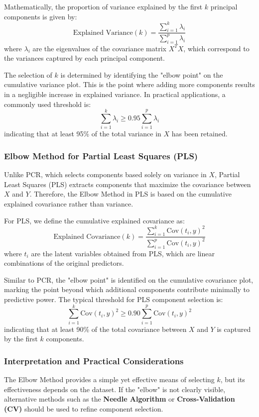 \documentclass[11pt,twoside,a4paper]{article}
\begin{document}
Mathematically, the proportion of variance explained by the first \( k \) principal components is given by:
\[
\text{Explained Variance}(k) = \frac{\sum_{i=1}^{k} \lambda_i}{\sum_{i=1}^{p} \lambda_i}
\]
where \( \lambda_i \) are the eigenvalues of the covariance matrix \( X^T X \), which correspond to the variances captured by each principal component.

The selection of \( k \) is determined by identifying the "elbow point" on the cumulative variance plot. This is the point where adding more components results in a negligible increase in explained variance. In practical applications, a commonly used threshold is:
\[
\sum_{i=1}^{k} \lambda_i \geq 0.95 \sum_{i=1}^{p} \lambda_i
\]
indicating that at least 95\% of the total variance in \( X \) has been retained.

\subsubsection{Elbow Method for Partial Least Squares (PLS)}
Unlike PCR, which selects components based solely on variance in \( X \), Partial Least Squares (PLS) extracts components that maximize the covariance between \( X \) and \( Y \). Therefore, the Elbow Method in PLS is based on the cumulative explained covariance rather than variance.

For PLS, we define the cumulative explained covariance as:
\[
\text{Explained Covariance}(k) = \frac{\sum_{i=1}^{k} \text{Cov}(t_i, y)^2}{\sum_{i=1}^{p} \text{Cov}(t_i, y)^2}
\]
where \( t_i \) are the latent variables obtained from PLS, which are linear combinations of the original predictors.

Similar to PCR, the "elbow point" is identified on the cumulative covariance plot, marking the point beyond which additional components contribute minimally to predictive power. The typical threshold for PLS component selection is:
\[
\sum_{i=1}^{k} \text{Cov}(t_i, y)^2 \geq 0.90 \sum_{i=1}^{p} \text{Cov}(t_i, y)^2
\]
indicating that at least 90\% of the total covariance between \( X \) and \( Y \) is captured by the first \( k \) components.

\subsubsection{Interpretation and Practical Considerations}
The Elbow Method provides a simple yet effective means of selecting \( k \), but its effectiveness depends on the dataset. If the "elbow" is not clearly visible, alternative methods such as the \textbf{Needle Algorithm} or \textbf{Cross-Validation (CV)} should be used to refine component selection.
\end{document}
